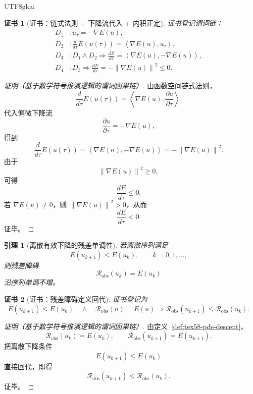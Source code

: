 \documentclass[12pt]{article}
\newtheorem{lemma}{引理}[section]
\newtheorem{Certificate}{证书}[section]
\newcommand{\Rcal}{\mathcal R}
\newcommand{\norm}[1]{\left\lVert #1 \right\rVert}
\newcommand{\ip}[2]{\left\langle #1,#2 \right\rangle}
\begin{document}
\begin{CJK*}{UTF8}{gkai}
\begin{Certificate}[证书：链式法则 + 下降流代入 + 内积正定]
\label{cert:tex58-continuous-descent}
证书登记谓词链：
\[
\begin{aligned}
  D_1 &: u_\tau=-\nabla E(u),\\
  D_2 &: \frac{d}{d\tau}E(u(\tau))=\ip{\nabla E(u)}{u_\tau},\\
  D_3 &: D_1\wedge D_2
         \Rightarrow
         \frac{dE}{d\tau}
         =
         \ip{\nabla E(u)}{-\nabla E(u)},\\
  D_4 &: D_3
         \Rightarrow
         \frac{dE}{d\tau}
         =
         -\norm{\nabla E(u)}^2\le0.
\end{aligned}
\]
\end{Certificate}

\begin{proof}[证明（基于数学符号推演逻辑的谓词因果链）]
由函数空间链式法则，
\[
  \frac{d}{d\tau}E(u(\tau))
  =
  \ip{\nabla E(u)}{\frac{\partial u}{\partial\tau}}.
\]
代入偏微下降流
\[
  \frac{\partial u}{\partial\tau}
  =
  -\nabla E(u),
\]
得到
\[
  \frac{d}{d\tau}E(u(\tau))
  =
  \ip{\nabla E(u)}{-\nabla E(u)}
  =
  -\norm{\nabla E(u)}^2.
\]
由于
\[
  \norm{\nabla E(u)}^2\ge0,
\]
可得
\[
  \frac{dE}{d\tau}\le0.
\]
若 \(\nabla E(u)\neq0\)，则 \(\norm{\nabla E(u)}^2>0\)，从而
\[
  \frac{dE}{d\tau}<0.
\]
证毕。
\end{proof}

\begin{lemma}[离散有效下降的残差单调性]
\label{lem:tex58-discrete-descent}
若离散序列满足
\[
  E(u_{k+1})\le E(u_k),
  \qquad k=0,1,\ldots,
\]
则残差障碍
\[
  \Rcal_{\mathrm{obs}}(u_k)=E(u_k)
\]
沿序列单调不增。
\end{lemma}

\begin{Certificate}[证书：残差障碍定义回代]
\label{cert:tex58-discrete-descent}
证书登记为
\[
  E(u_{k+1})\le E(u_k)
  \quad\wedge\quad
  \Rcal_{\mathrm{obs}}(u)=E(u)
  \Longrightarrow
  \Rcal_{\mathrm{obs}}(u_{k+1})\le \Rcal_{\mathrm{obs}}(u_k).
\]
\end{Certificate}

\begin{proof}[证明（基于数学符号推演逻辑的谓词因果链）]
由定义~\ref{def:tex58-pde-descent}，
\[
  \Rcal_{\mathrm{obs}}(u_k)=E(u_k),
  \qquad
  \Rcal_{\mathrm{obs}}(u_{k+1})=E(u_{k+1}).
\]
把离散下降条件
\[
  E(u_{k+1})\le E(u_k)
\]
直接回代，即得
\[
  \Rcal_{\mathrm{obs}}(u_{k+1})\le\Rcal_{\mathrm{obs}}(u_k).
\]
证毕。
\end{proof}


\end{CJK*}
\end{document}
